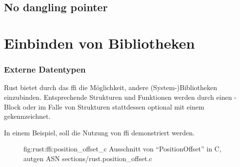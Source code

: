 
\subsection{No dangling pointer}


\section{Einbinden von Bibliotheken}

\subsubsection{Externe Datentypen}
\label{rust:ffi:datatypes}

Rust bietet durch das \gls{ffi} die Möglichkeit, andere (System-)Bibliotheken einzubinden.
Entsprechende Strukturen und Funktionen werden durch einen -Block
oder im Falle von Strukturen stattdessen optional mit einem \rustcinline{#[repr(C)]} gekennzeichnet.

In einem Beispiel, soll die Nutzung von \gls{ffi} demonstriert werden.

\begin{figure}[H]
	\ccinclude
		{fig:rust:ffi:position_offset_c}
		{Ausschnitt von \enquote{PositionOffset}  in C, autgen ASN}
		{sections/rust.position_offset.c}
	
\end{figure}

